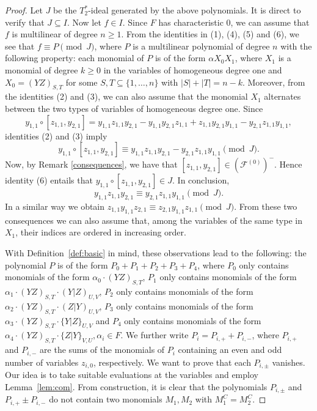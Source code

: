 \documentclass[10pt,a4paper]{amsart}
\begin{document}
	\begin{proof}
		Let $J$ be the $T_2^*$-ideal generated by the above polynomials. It is direct to verify that $J\subseteq I$. Now let $f\in I$. Since $F$ has characteristic $0$, we can assume that $f$ is multilinear of degree $n\ge 1$. From the identities in (1), (4), (5) and (6), we see that $f\equiv P\pmod J$, where $P$ is a multilinear polynomial of degree $n$ with the following property: 
		each monomial of $P$ is of the form $\alpha X_0X_1$, where
		$X_1$ is a monomial of degree $k\ge 0$ in the variables of homogeneous degree one and
		$X_0=(YZ)_{S, T}$ for some $S, T\subseteq \{1, \ldots, n\}$ with $|S|+|T|=n-k$. Moreover, from the identities (2) and (3), we can also assume that the monomial $X_1$ alternates between the two types of variables of homogeneous degree one. Since 
		$$y_{1, 1}\circ [z_{1, 1}, y_{2, 1}]=y_{1, 1}z_{1, 1}y_{2, 1}-y_{1, 1}y_{2, 1}z_{1, 1}+z_{1, 1}y_{2, 1}y_{1, 1}-y_{2, 1}z_{1, 1}y_{1, 1},$$
		identities (2) and (3) imply 
		$$y_{1, 1}\circ [z_{1, 1}, y_{2, 1}]\equiv y_{1, 1}z_{1, 1}y_{2, 1}-y_{2, 1}z_{1, 1}y_{1, 1}\pmod J.$$
		Now, by Remark \ref{consequences}, we have that $ [z_{1, 1}, y_{2, 1}]\in (\mathcal{F}^{(0)})^-$. Hence identity (6) entails that $y_{1, 1}\circ [z_{1, 1}, y_{2, 1}]\in J$. In conclusion,  
		$$y_{1, 1}z_{1, 1}y_{2, 1}\equiv y_{2, 1}z_{1, 1}y_{1, 1}\pmod J.$$
		In a similar way we obtain $z_{1, 1}y_{1, 1}z_{2, 1}\equiv z_{2, 1}y_{1, 1}z_{1, 1}\pmod J.$
		From these two consequences we can also assume that, among the variables of the same type in $X_1$, their indices are ordered in increasing order. 
		
		With Definition~\ref{def:basic} in mind, these observations lead to the following: the polynomial $P$ is of the form $P_0+P_1+P_2+P_3+P_4$, where $P_0$ only contains monomials of the form $\alpha_0\cdot (YZ)_{S, T}$, $P_1$ only contains monomials of the form $\alpha_1\cdot (YZ)_{S, T}\cdot (Y|Z)_{U, V}$, $P_2$ only contains monomials of the form $\alpha_2\cdot (YZ)_{S, T}\cdot (Z|Y)_{U, V}$, $P_3$ only contains monomials of the form $\alpha_3\cdot (YZ)_{S, T}\cdot \{Y|Z\}_{U, V}$ and $P_4$ only contains monomials of the form $\alpha_4\cdot (YZ)_{S, T}\cdot  \{Z|Y\}_{V, U},\alpha_i\in F$. We further write $P_i=P_{i, +}+P_{i, -}$, where $P_{i, +}$ and $P_{i, -}$ are the sums of the monomials of $P_i$ containing an even and odd number of variables $z_{i, 0}$, respectively. We want to prove that each $P_{i, \pm}$ vanishes. Our idea is to take suitable evaluations at the variables and employ Lemma~\ref{lem:com}. From construction, it is clear that the polynomials $P_{i, \pm}$ and $P_{i, +}\pm P_{i, -}$ do not contain two monomials $M_1, M_2$ with $M_1^C=M_2^C$. 
		

\end{proof}
\end{document}
